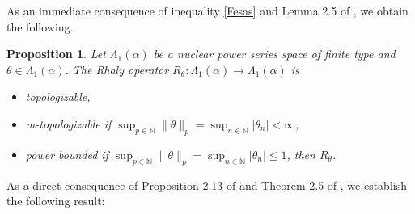 \documentclass{birkjour}
\newtheorem{thm}{Theorem}[section]
\newtheorem{prop}[thm]{Proposition}
\theoremstyle{definition}
\theoremstyle{remark}
\numberwithin{equation}{section}
\begin{document}
As an immediate consequence of inequality \eqref{Fesas} and 
Lemma 2.5 of \cite{N3}, we obtain the following.
\begin{prop} Let $\Lambda_{1}(\alpha)$ be a nuclear power series space of finite type and  $\theta\in \Lambda_{1}(\alpha)$. The Rhaly operator $R_{\theta}:\Lambda_{1}(\alpha)\to \Lambda_{1}(\alpha)$  is
\begin{itemize}
\item[i.] topologizable,
\item[ii.] m-topologizable if $\displaystyle \sup_{p\in \mathbb{N}}\|\theta\|_{p}=\sup_{n\in \mathbb{N}}|\theta_{n}|<\infty$,
\item[iii.] power bounded if $\displaystyle \sup_{p\in \mathbb{N}}\|\theta\|_{p}=\sup_{n\in \mathbb{N}}|\theta_{n}|\leq 1$, then $R_{\theta}$.
\end{itemize}
\end{prop}

As a direct consequence of Proposition 2.13 of \cite{ABR} and Theorem 2.5 of \cite{K1}, we establish the following result:
\end{document}
